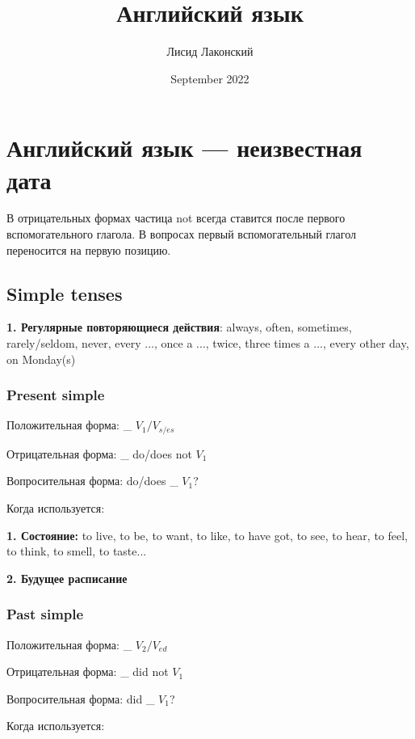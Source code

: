 \documentclass{article}
\title{Английский язык}
\author{Лисид Лаконский}
\date{September 2022}
\begin{document}
\maketitle
\tableofcontents
\pagebreak

\section{Английский язык — неизвестная дата}

В отрицательных формах частица not всегда ставится после первого вспомогательного глагола. В вопросах первый вспомогательный глагол переносится на первую позицию.

\subsection{Simple tenses}

\textbf{1. Регулярные повторяющиеся действия}: always, often, sometimes, rarely/seldom, never, every ..., once a ..., twice, three times a ..., every other day, on Monday(s)

\subsubsection{Present simple}

Положительная форма: \_ $V_{1}/V_{s/es}$

\noindent Отрицательная форма: \_ do/does not $V_{1}$

\noindent Вопросительная форма: do/does \_ $V_{1}$?

\hfill

\noindent Когда используется:

\indent \textbf{1. Состояние:} to live, to be, to want, to like, to have got, to see, to hear, to feel, to think, to smell, to taste...

\indent \textbf{2. Будущее расписание}

\subsubsection{Past simple}

Положительная форма: \_ $V_{2}/V_{ed}$

\noindent Отрицательная форма: \_ did not $V_{1}$

\noindent Вопросительная форма: did \_ $V_{1}$?

\hfill

\noindent Когда используется:
\end{document}
